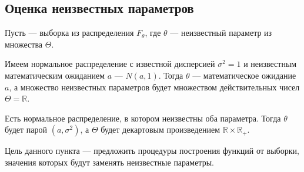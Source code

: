\begin{comment}
Если устремить количество полуинтервалов к бесконечности ($m\to\infty$),
то каждый полуинтервал будет сжиматься в точку.
При этом вероятность попадания $x$ в отрезок будет стремиться
к вероятности попадания $x$ в точку $y$.
Введём обозначения $|I_j|= \delta$, $I_j=\Delta_y$
$$\probabilityn{x=y}
\approx\probabilityn{x\in\Delta_y}=q_n\left(y\right)\cdot\delta,
\qquad m\to\infty$$

Очень напоминает ситуацию с плотностью распределения
непрерывной случайной величины $\xi$
$$\probability{\xi=x}\approx\pdf{x}\cdot\delta,\qquad\delta\to 0$$

Нужно отметить, что количество элементов выборки
должно стремиться к бесконечности ($n\to\infty$),
так как плотность может быть лишь у непрерывных случайных величин.
Чем больше будет элементов,
тем плотнее они будут стоять на числовой прямой.
\end{comment}
\subsection{Оценка неизвестных параметров}
Пусть \xsample --- выборка из распределения $F_\theta$,
где $\theta$ --- неизвестный параметр из множества $\Theta$.

\begin{example}
  Имеем нормальное распределение с известной дисперсией $\sigma^2 = 1$
  и неизвестным математическим ожиданием $a$ --- $N\left(a,1\right)$.
  Тогда $\theta$ --- математическое ожидание $a$, а множество неизвестных
  параметров будет множеством действительных чисел $\Theta = \mathbb{R}$.
\end{example}
\begin{example}
  Есть нормальное распределение, в котором неизвестны оба параметра.
  Тогда $\theta$ будет парой $\left( a,\sigma^2 \right)$,
  а $\Theta$ будет декартовым произведением $\mathbb{R} \times \mathbb{R_+}$.
\end{example}

Цель данного пункта --- предложить процедуры построения функций от выборки,
значения которых будут заменять неизвестные параметры.

